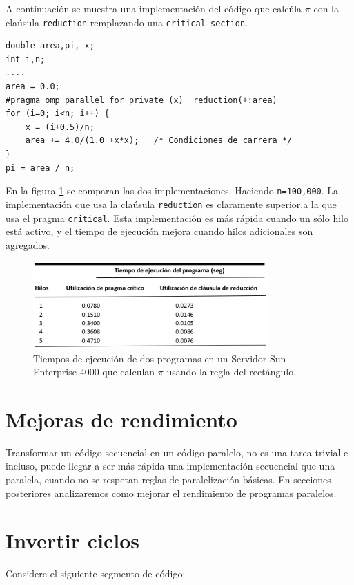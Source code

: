 \documentclass[12pt,letterpaper]{book}
\begin{document}
A continuación se muestra una implementación del código que calcúla $\pi$ con la claúsula \texttt{reduction} remplazando una \texttt{critical section}.

\begin{lstlisting}[style=C]
double area,pi, x;
int i,n;
....
area = 0.0;
#pragma omp parallel for private (x)  reduction(+:area)
for (i=0; i<n; i++) {
	x = (i+0.5)/n;
	area += 4.0/(1.0 +x*x);   /* Condiciones de carrera */
}
pi = area / n;
\end{lstlisting}

En la figura \ref{fig:reduc_speed} se comparan las dos implementaciones.  Haciendo \texttt{n=100,000}. La implementación que usa la claúsula \texttt{reduction} es claramente superior,a la que usa el pragma \texttt{critical}. Esta implementación es más rápida cuando un sólo hilo está activo, y el tiempo de ejecución mejora cuando hilos adicionales son agregados.

\begin{figure}
\begin{center}
\includegraphics[width=9cm]{../imagenes/reduc_speed.png} 
\end{center}
\caption{ Tiempos de ejecución de dos programas en un Servidor Sun Enterprise 4000 que calculan $\pi$ usando la regla del rectángulo.}
\label{fig:reduc_speed}
\end{figure}


\section{Mejoras de rendimiento}
Transformar un código secuencial en un código paralelo, no es una tarea trivial e incluso, puede llegar a ser más rápida una implementación secuencial que una paralela, cuando no se respetan reglas de paralelización básicas. En secciones posteriores analizaremos como mejorar el rendimiento de programas paralelos.


\section{{Invertir ciclos}}

Considere el siguiente segmento de código:
\end{document}
